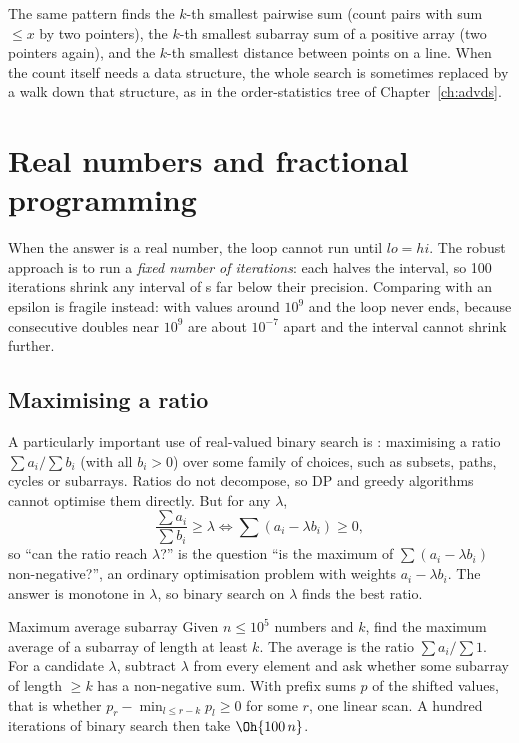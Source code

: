 The same pattern finds the $k$-th smallest pairwise sum (count pairs with sum $\le x$ by two pointers), the $k$-th smallest
subarray sum of a positive array (two pointers again), and the $k$-th smallest distance between points on a line. When the
count itself needs a data structure, the whole search is sometimes replaced by a walk down that structure, as in the
order-statistics tree of Chapter~\ref{ch:advds}.

\section[Real numbers and fractional programming]{Real numbers and fractional programming \hfill \gold}\label{sec:bsearch-real}

When the answer is a real number, the loop cannot run until $lo = hi$. The robust approach is to run a \emph{fixed number of
iterations}: each halves the interval, so 100 iterations shrink any interval of s far below their precision.
Comparing  with an epsilon is fragile instead: with values around $10^{9}$ and  the loop never
ends, because consecutive doubles near $10^9$ are about $10^{-7}$ apart and the interval cannot shrink further.


\subsection{Maximising a ratio}

A particularly important use of real-valued binary search is : maximising a ratio
$\sum a_i / \sum b_i$ (with all $b_i > 0$) over some family of choices, such as subsets, paths, cycles or subarrays. Ratios do
not decompose, so DP and greedy algorithms cannot optimise them directly. But for any $\lambda$,
\[
  \frac{\sum a_i}{\sum b_i} \ge \lambda \iff \sum (a_i - \lambda b_i) \ge 0 ,
\]
so ``can the ratio reach $\lambda$?'' is the question ``is the maximum of $\sum (a_i - \lambda b_i)$ non-negative?'', an
ordinary optimisation problem with weights $a_i - \lambda b_i$. The answer is monotone in $\lambda$, so binary search on
$\lambda$ finds the best ratio.

\begin{problem}{Maximum average subarray}
Given $n \le 10^5$ numbers and $k$, find the maximum average of a subarray of length at least $k$.
\solution The average is the ratio $\sum a_i / \sum 1$. For a candidate $\lambda$, subtract $\lambda$ from every element and
ask whether some subarray of length $\ge k$ has a non-negative sum. With prefix sums $p$ of the shifted values, that is
whether $p_r - \min_{l \le r - k} p_l \ge 0$ for some $r$, one linear scan. A hundred iterations of binary search then take
$\Oh{100\, n}$.
\end{problem}

